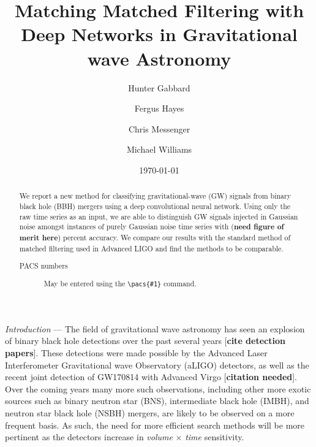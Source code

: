 \documentclass[%
 amsmath,amssymb,
 aps,
 twocolumn,
floatfix,
]{revtex4-1}
\begin{document}

\title{Matching Matched Filtering with Deep Networks in Gravitational wave Astronomy}

\author{Hunter Gabbard}
\author{Fergus Hayes}
\author{Chris Messenger}
\author{Michael Williams}

\date{\today}%

\begin{abstract}
 We report a new method for classifying gravitational-wave (GW) signals from binary black hole (BBH) mergers using a deep convolutional neural network. Using only the raw time series as an input, we are able to distinguish GW signals injected in Gaussian noise amongst instances of purely Gaussian noise time series with (\textbf{need figure of merit here}) percent accuracy. We compare our results with the standard method of matched filtering used in Advanced LIGO and find the methods to be comparable.  
\begin{description}
\item[PACS numbers]
May be entered using the \verb+\pacs{#1}+ command.
\end{description}
\end{abstract}

\maketitle



\textit{Introduction} --- The field of gravitational wave astronomy has seen an explosion of binary black hole detections over the past several years [\textbf{cite detection papers}]. These detections were made possible by the Advanced Laser Interferometer Gravitational wave Observatory (aLIGO) detectors, as well as the recent joint detection of GW170814 with Advanced Virgo [\textbf{citation needed}]. Over the coming years many more such observations, including other more exotic sources such as binary neutron star (BNS), intermediate black hole (IMBH), and neutron star black hole (NSBH) mergers, are likely to be observed on a more frequent basis. As such, the need for more efficient search methods will be more pertinent as the detectors increase in \textit{volume} $\times$ \textit{time} sensitivity.
\end{document}
